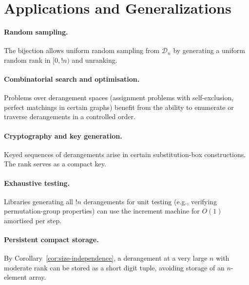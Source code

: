 \documentclass[11pt,a4paper]{article}
\newcommand{\subfact}[1]{!{#1}} %
\begin{document}
    \section{Applications and Generalizations}
    \label{sec:applications}

    \paragraph{Random sampling.} The bijection allows uniform random sampling
    from $\mathcal{D}_n$ by generating a uniform random rank in
    $[0, \subfact{n})$ and unranking.

    \paragraph{Combinatorial search and optimisation.} Problems over
    derangement spaces (assignment problems with self-exclusion, perfect
    matchings in certain graphs) benefit from the ability to enumerate or
    traverse derangements in a controlled order.

    \paragraph{Cryptography and key generation.} Keyed sequences of
    derangements arise in certain substitution-box constructions. The rank
    serves as a compact key.

    \paragraph{Exhaustive testing.} Libraries generating all $\subfact{n}$
    derangements for unit testing (e.g., verifying permutation-group
    properties) can use the increment machine for $O(1)$ amortised per step.

    \paragraph{Persistent compact storage.} By Corollary~\ref{cor:size-independence},
    a derangement at a very large $n$ with moderate rank can be stored as a
    short digit tuple, avoiding storage of an $n$-element array.
\end{document}

